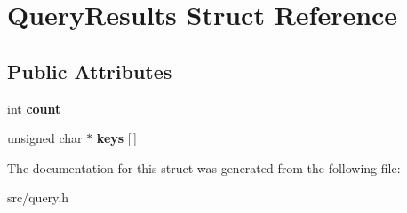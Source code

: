 \hypertarget{struct_query_results}{}\section{Query\+Results Struct Reference}
\label{struct_query_results}
\subsection*{Public Attributes}
\begin{DoxyCompactItemize}
\item 
\hypertarget{struct_query_results_a976de07ec3d3182cddc5f6720912c21f}{}int {\bfseries count}\label{struct_query_results_a976de07ec3d3182cddc5f6720912c21f}

\item 
\hypertarget{struct_query_results_a19d38224b317f2ba566be472c11d22bd}{}unsigned char $\ast$ {\bfseries keys} \mbox{[}$\,$\mbox{]}\label{struct_query_results_a19d38224b317f2ba566be472c11d22bd}

\end{DoxyCompactItemize}


The documentation for this struct was generated from the following file\+:\begin{DoxyCompactItemize}
\item 
src/query.\+h\end{DoxyCompactItemize}
